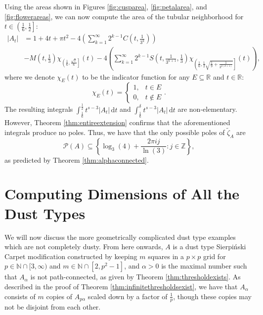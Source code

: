 \documentclass{article}
\theoremstyle{plain}
\numberwithin{equation}{section}
\numberwithin{table}{section}
\numberwithin{figure}{section}
\begin{document}
Using the areas shown in Figures \ref{fig:cusparea}, \ref{fig:petalarea}, and \ref{fig:flowerareas}, we can now compute the area of the tubular neighborhood for $t \in \left(\frac{1}{6}, \frac{1}{2}\right]$:
\begin{align}
|A_t| &= 1 + 4t + \pi t^2 - 4 \left(\sum_{k=1}^{\infty} 2^{k-1} C\left(t,\frac{1}{3^k}\right)\right)\nonumber\\&- M\left(t,\frac{1}{3}\right) \chi_{\left(\frac{1}{6}, \frac{\sqrt{2}}{6}\right]}(t) - 4 \left(\sum_{k=1}^{\infty} 2^{k-1} S\left(t,\frac{1}{3^{k+1}},\frac{1}{3}\right) \chi_{\left(\frac{1}{6}, \frac{1}{2}\sqrt{\frac{1}{9}+\frac{1}{3^{2(k+1)}}}\right]}(t)\right),
\end{align}
where we denote $\chi_E(t)$ to be the indicator function for any $E \subseteq \mathbb{R}$ and $t \in \mathbb{R}$:
\begin{equation}
\chi_E(t) = \begin{cases}
1, & t \in E \\
0, & t \notin E
\end{cases}.
\end{equation}
The resulting integrals $\displaystyle\int_{\frac{1}{6}}^{\frac{1}{2}} t^{s-3} |A_t| \,\mathrm{d}t$ and $\displaystyle\int_{\frac{1}{6}}^{\delta} t^{s-3} |A_t| \,\mathrm{d}t$ are non-elementary. However, Theorem \ref{thm:entireextension} confirms that the aforementioned integrals produce no poles. Thus, we have that the only possible poles of $\tilde{\zeta}_A$ are
\begin{equation}
\mathscr{P}(A) \subseteq \left\{\log_3(4) + \frac{2\pi i j}{\ln(3)}: j \in \mathbb{Z}\right\},
\end{equation}
as predicted by Theorem \ref{thm:alphaconnected}.





\section{Computing Dimensions of All the Dust Types} \label{chap:computingdust}
We will now discuss the more geometrically complicated dust type examples which are not completely dusty. From here onwards, $A$ is a dust type Sierpi\'nski Carpet modification constructed by keeping $m$ squares in a $p \times p$ grid for $p \in \mathbb{N} \cap [3,\infty)$ and $m \in \mathbb{N} \cap [2, p^2-1]$, and $\alpha > 0$ is the maximal number such that $A_{\alpha}$ is not path-connected, as given by Theorem \ref{thm:thresholdexists}. As described in the proof of Theorem \ref{thm:infinitethresholdsexist}, we have that $A_{\alpha}$ consists of $m$ copies of $A_{p\alpha}$ scaled down by a factor of $\frac{1}{p}$, though these copies may not be disjoint from each other.
\end{document}
